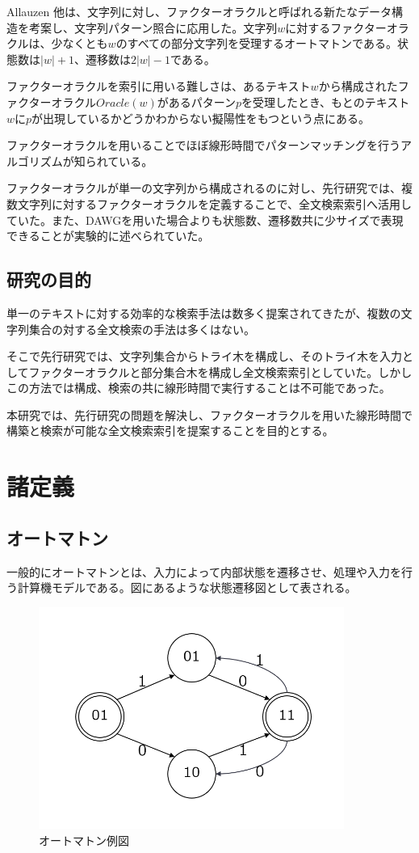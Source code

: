 \documentclass[11pt,a4paper]{jreport}
\begin{document}
 Allauzen 他は、文字列に対し、ファクターオラクルと呼ばれる新たなデータ構造を考案し、文字列パターン照合に応用した。文字列$w$に対するファクターオラクル\cite{allauzen}は、少なくとも$w$のすべての部分文字列を受理するオートマトンである。状態数は$|w|+1$、遷移数は$2|w|-1$である。

 ファクターオラクルを索引に用いる難しさは、あるテキスト$w$から構成されたファクターオラクル$Oracle(w)$があるパターン$p$を受理したとき、もとのテキスト$w$に$p$が出現しているかどうかわからない擬陽性をもつという点にある。

 ファクターオラクルを用いることでほぼ線形時間でパターンマッチングを行うアルゴリズム\cite{kato}が知られている。

 ファクターオラクルが単一の文字列から構成されるのに対し、先行研究\cite{ohi}では、複数文字列に対するファクターオラクルを定義することで、全文検索索引へ活用していた。また、DAWGを用いた場合よりも状態数、遷移数共に少サイズで表現できることが実験的に述べられていた。

  \section{研究の目的}
  単一のテキストに対する効率的な検索手法は数多く提案されてきたが、複数の文字列集合の対する全文検索の手法は多くはない。

 そこで先行研究では、文字列集合からトライ木を構成し、そのトライ木を入力としてファクターオラクルと部分集合木を構成し全文検索索引としていた。しかしこの方法では構成、検索の共に線形時間で実行することは不可能であった。

 本研究では、先行研究の問題を解決し、ファクターオラクルを用いた線形時間で構築と検索が可能な全文検索索引を提案することを目的とする。

  \chapter{諸定義}

  \section{オートマトン}
  一般的にオートマトンとは、入力によって内部状態を遷移させ、処理や入力を行う計算機モデルである。図にあるような状態遷移図として表される。

  \begin{figure}[htbp]
    \centering
    \includegraphics[width=10cm]{automaton.png}

    \caption{オートマトン例図}
  \end{figure}
\end{document}
